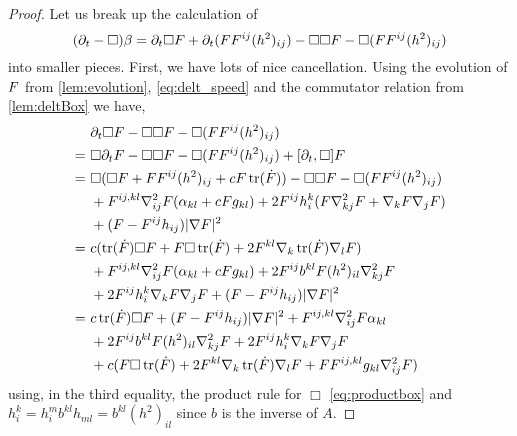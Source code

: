 \documentclass{amsart}
\begin{document}
\begin{proof}
Let us break up the calculation of
\[
(\partial_{t} - \Box)\beta =  \partial_{t}\Box F + \partial_{t} (FF^{ij} (h^2)_{ij}) - \Box\Box F - \Box(FF^{ij} (h^2)_{ij})
\]
into smaller pieces. First, we have lots of nice cancellation. Using the evolution of \(F\) from \cref{lem:evolution}, \cref{eq:delt_speed} and the commutator relation from \cref{lem:deltBox} we have,
\begin{equation}
\label{eq:deltbeta1}
\begin{split}
&\partial_{t}\Box\p - \Box\Box\p - \Box(\p\p^{ij} (h^2)_{ij})\\ =\ &\Box\partial_t\p - \Box\Box\p - \Box(\p\p^{ij} (h^2)_{ij}) + [\partial_t, \Box] \p \\
=\ &\Box(\Box \p + \p\p^{ij}(h^2)_{ij} + c \p\operatorname{tr}(\dot{\p})) - \Box\Box\p - \Box(\p\p^{ij} (h^2)_{ij})\\
\quad &+ \p^{ij,kl} \nabla^2_{ij} \p (\a_{kl} + c \p g_{kl}) + 2\p^{ij}h^{k}_{i} (\p \nabla^2_{kj} \p + \nabla_k \p \nabla_j \p)\\ 
\quad &+ (\p - \p^{ij}h_{ij})| \nabla\p|^{2} \\
=\ &c (\operatorname{tr}(\dot{\p}) \Box \p + \p \Box \operatorname{tr}(\dot{\p}) + 2 \p^{kl} \nabla_k \operatorname{tr}(\dot{\p}) \nabla_l \p) \\
\quad &+ \p^{ij,kl} \nabla^2_{ij} \p (\a_{kl} + c \p g_{kl}) + 2\p^{ij}b^{kl} \p (h^2)_{il} \nabla^2_{kj} \p\\
\quad  &+ 2\p^{ij}h^{k}_{i} \nabla_k \p \nabla_j \p + (\p - \p^{ij}h_{ij})| \nabla\p|^{2} \\
=\ &c \operatorname{tr}(\dot{\p}) \Box \p + (\p - \p^{ij}h_{ij})| \nabla\p|^{2}  + \p^{ij,kl} \nabla^2_{ij} \p \a_{kl} \\
\quad &+ 2\p^{ij}b^{kl} \p (h^2)_{il} \nabla^2_{kj} \p + 2\p^{ij}h^{k}_{i} \nabla_k \p \nabla_j \p \\
\quad &+ c(\p \Box \operatorname{tr}(\dot{\p}) + 2 \p^{kl} \nabla_k \operatorname{tr}(\dot{\p}) \nabla_l \p + \p \p^{ij,kl} g_{kl} \nabla^2_{ij} \p)
\end{split}
\end{equation}
using, in the third equality, the product rule for \(\Box\) \cref{eq:productbox} and \(h^k_i = h^m_i b^{kl}h_{ml} = b^{kl} (h^2)_{il}\) since \(b\) is the inverse of \(A\).


\end{proof}
\end{document}
